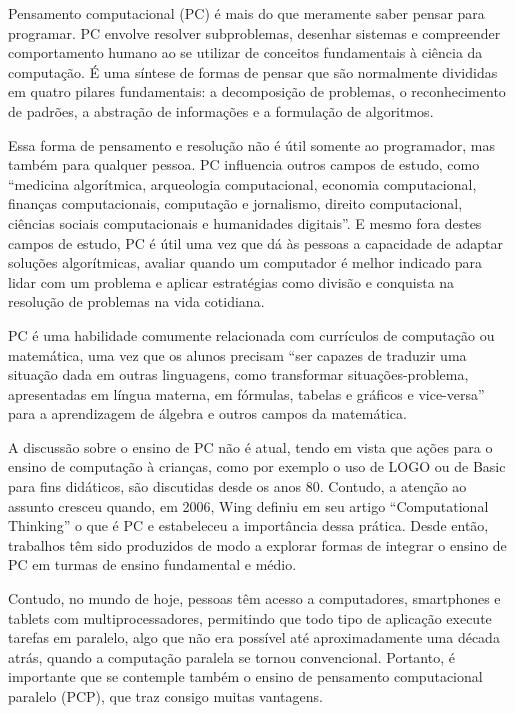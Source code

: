 \documentclass[conference]{IEEEtran}
\begin{document}
Pensamento computacional (PC) é mais do que meramente saber pensar para programar. PC envolve resolver subproblemas, desenhar sistemas e compreender comportamento humano ao se utilizar de conceitos fundamentais à ciência da computação\cite{b2}. É uma síntese de formas de pensar que são normalmente divididas em quatro pilares fundamentais: a decomposição de problemas, o reconhecimento de padrões, a abstração de informações e a formulação de algoritmos\cite{b6}.

 Essa forma de pensamento e resolução não é útil somente ao programador, mas também para qualquer pessoa. PC influencia outros campos de estudo, como ``medicina algorítmica, arqueologia computacional, economia computacional, finanças computacionais, computação e jornalismo, direito computacional, ciências sociais computacionais e humanidades digitais\cite{b7}''. E mesmo fora destes campos de estudo, PC é útil uma vez que dá às pessoas a capacidade de adaptar soluções algorítmicas, avaliar quando um computador é melhor indicado para lidar com um problema e aplicar estratégias como divisão e conquista na resolução de problemas na vida cotidiana\cite{b7}.

PC é uma habilidade comumente relacionada com currículos de computação\cite{b8} ou matemática, uma vez que os alunos precisam ``ser capazes de traduzir uma situação dada em outras linguagens, como transformar situações-problema, apresentadas em língua materna, em fórmulas, tabelas e gráficos e vice-versa''\cite{b4} para a aprendizagem de álgebra e outros campos da matemática. 

A discussão sobre o ensino de PC não é atual, tendo em vista que ações para o ensino de computação à crianças, como por exemplo o uso de LOGO ou de Basic para fins didáticos, são discutidas desde os anos 80\cite{b9}. Contudo, a atenção ao assunto cresceu quando, em 2006, Wing definiu em seu artigo ``Computational Thinking'' o que é PC e estabeleceu a importância dessa prática. Desde então, trabalhos têm sido produzidos de modo a explorar formas de integrar o ensino de PC em turmas de ensino fundamental e médio\cite{b1}\cite{b10}\cite{b11}\cite{b12}.

Contudo, no mundo de hoje, pessoas têm acesso a computadores, smartphones e tablets com multiprocessadores, permitindo que todo tipo de aplicação execute tarefas em paralelo, algo que não era possível até aproximadamente uma década atrás, quando a computação paralela se tornou convencional.  Portanto, é importante que se contemple também o ensino de pensamento computacional paralelo (PCP),  que traz consigo muitas vantagens\cite{b5}.
\end{document}

